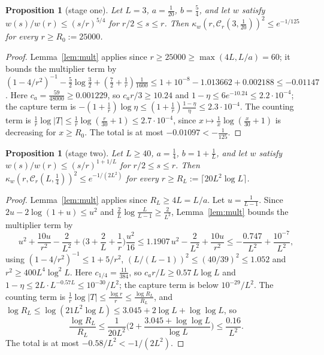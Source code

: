 \documentclass[11pt]{amsart}
\newtheorem{proposition}[theorem]{Proposition}
\theoremstyle{definition}
\begin{document}
\begin{proposition}[stage one]\label{prop:stage1}
Let $L=3$, $a=\frac1{20}$, $b=\frac54$, and let $w$ satisfy $w(s)/w(r)\le(s/r)^{5/4}$ for $r/2\le s\le r$. Then $\kappa_w(r,\mathcal C_r(3,\frac1{20}))^2\le e^{-1/125}$ for every $r\ge R_0:=25000$.
\end{proposition}

\begin{proof}
Lemma~\ref{lem:mult} applies since $r\ge25000\ge\max(4L,L/a)=60$; it bounds the multiplier term by $(1-4/r^2)^{-1}-\frac52\log\frac32+(\frac72+\frac1r)\frac1{1600}\le1+10^{-8}-1.013662+0.002188\le-0.01147$. Here $c_a=\frac{59}{48000}\ge0.001229$, so $c_ar/3\ge10.24$ and $1-\eta\le6e^{-10.24}\le2.2\cdot10^{-4}$; the capture term is $-(1+\frac1r)\log\eta\le(1+\frac1r)\frac{1-\eta}\eta\le2.3\cdot10^{-4}$. The counting term is $\frac1r\log|T|\le\frac1r\log(\frac r{30}+1)\le2.7\cdot10^{-4}$, since $x\mapsto\frac1x\log(\frac{x}{30}+1)$ is decreasing for $x\ge R_0$. The total is at most $-0.01097<-\frac1{125}$.
\end{proof}

\begin{proposition}[stage two]\label{prop:stage2}
Let $L\ge40$, $a=\frac14$, $b=1+\frac1L$, and let $w$ satisfy $w(s)/w(r)\le(s/r)^{1+1/L}$ for $r/2\le s\le r$. Then $\kappa_w(r,\mathcal C_r(L,\frac14))^2\le e^{-1/(2L^2)}$ for every $r\ge R_L:=\lceil20L^2\log L\rceil$.
\end{proposition}

\begin{proof}
Lemma~\ref{lem:mult} applies since $R_L\ge4L=L/a$. Let $u=\frac1{L-1}$. Since $2u-2\log(1+u)\le u^2$ and $\frac2L\log\frac L{L-1}\ge\frac2{L^2}$, Lemma~\ref{lem:mult} bounds the multiplier term by
\[
u^2+\frac{10u}{r^2}-\frac2{L^2}+\Big(3+\frac2L+\frac1r\Big)\frac{u^2}{16}\le1.1907\,u^2-\frac2{L^2}+\frac{10u}{r^2}\le-\frac{0.747}{L^2}+\frac{10^{-7}}{L^2},
\]
using $(1-4/r^2)^{-1}\le1+5/r^2$, $(L/(L-1))^2\le(40/39)^2\le1.052$ and $r^2\ge400L^4\log^2L$. Here $c_{1/4}=\frac{11}{384}$, so $c_ar/L\ge0.57\,L\log L$ and $1-\eta\le2L\cdot L^{-0.57L}\le10^{-30}/L^2$; the capture term is below $10^{-29}/L^2$. The counting term is $\frac1r\log|T|\le\frac{\log r}r\le\frac{\log R_L}{R_L}$, and $\log R_L\le\log(21L^2\log L)\le3.045+2\log L+\log\log L$, so
\[
\frac{\log R_L}{R_L}\le\frac{1}{20L^2}\Big(2+\frac{3.045+\log\log L}{\log L}\Big)\le\frac{0.16}{L^2}.
\]
The total is at most $-0.58/L^2<-1/(2L^2)$.
\end{proof}
\end{document}

